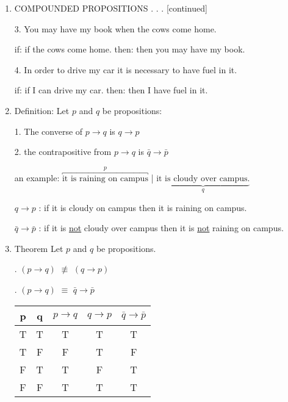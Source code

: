 \documentclass[10pt,letterpaper]{article}
\begin{document}
{

\begin{enumerate}
    \item[]
    \begin{center}
            COMPOUNDED PROPOSITIONS . . . [continued]
    \end{center}
    \vspace{1.0em}
    3. You may have my book when the cows come home.
    
    \qquad if: if the cows come home. \quad then: then you may have my book.
    
    4. In order to drive my car it is necessary to have fuel in it.
    
    \qquad if: if I can drive my car. \quad then: then I have fuel in it.
    \vspace{1em}
    \item[] Definition: Let $p$ and $q$ be propositions:
    
    1. The converse of $p \rightarrow q$ is \quad $q \rightarrow p$
    
    2. the contrapositive from $p \rightarrow q$ is $\bar{q} \rightarrow \bar{p}$
    \vspace{1em}
    
    an example: $\overbracket{\text{it is raining on campus}}^{p}$ | $\underbrace{\text{it is cloudy over campus.}}_{q}$
    
    $q \rightarrow p$ : if it is cloudy on campus then it is raining on campus. 
 
    $\bar{q} \rightarrow \bar{p}$ : if it is \underline{not} cloudy over campus then it is \underline{not} raining on campus.
    
    \item[] Theorem Let $p$ and $q$ be propositions.
    
    . $(p \rightarrow q)$ $\not\equiv$ $(q \rightarrow p)$
    
    . $(p \rightarrow q)$ $\equiv$ $\bar{q} \rightarrow \bar{p}$
    
    \begin{table}[h!]
    \centering
    \label{z} %
    \begin{tabular}{|cc|c|c|c|} %
        \hline
        p & q & ${p \rightarrow q}$ & $q \rightarrow p$ & $\bar{q} \rightarrow \bar{p}$ \\
        \hline
        T & T & T& T & T \\
        T & F & F& T & F \\
        F & T & T& F & T \\
        F & F & T& T & T \\
        \cline{1-5}
         \hline
        \end{tabular}
    \end{table}
    

\end{enumerate}}
\end{document}
